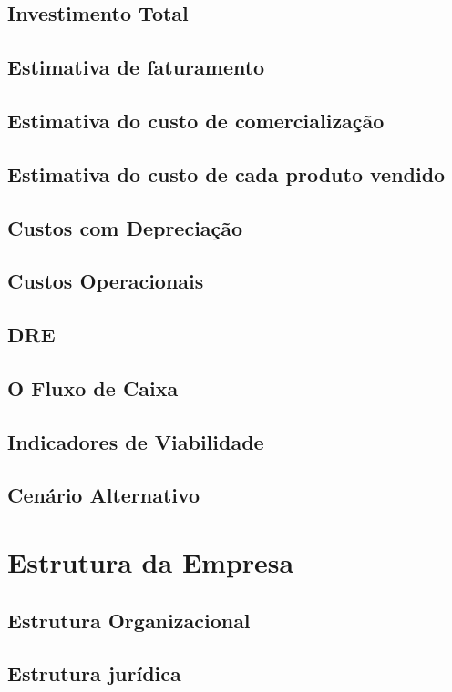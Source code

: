 \documentclass[a4paper, 12pt]{paper}
\begin{document}
\subsection{Investimento Total}
\subsection{Estimativa de faturamento}
\subsection{Estimativa do custo de comercialização}
\subsection{Estimativa do custo de cada produto vendido}
\subsection{Custos com Depreciação}
\subsection{Custos Operacionais}
\subsection{DRE}
\subsection{O Fluxo de Caixa}
\subsection{Indicadores de Viabilidade}
\subsection{Cenário Alternativo}
\newpage
\section{Estrutura da Empresa}
\subsection{Estrutura Organizacional}
\subsection{Estrutura jurídica}
\end{document}
